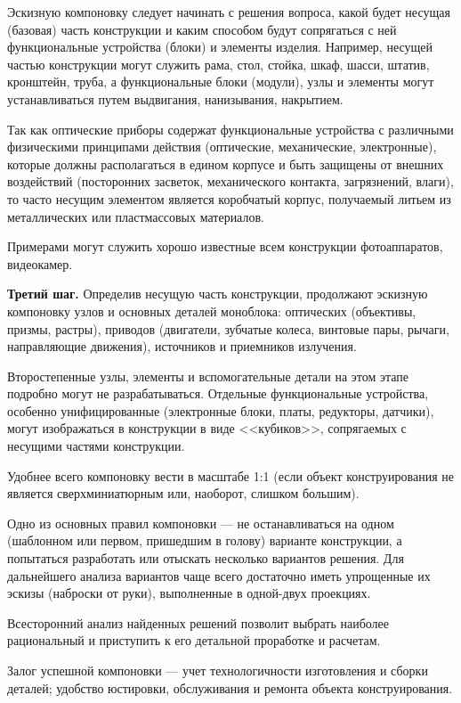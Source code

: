 Эскизную компоновку следует начинать с решения вопроса, какой будет несущая (базовая) часть конструкции и каким способом будут сопрягаться с ней функциональные устройства (блоки) и элементы изделия. Например, несущей частью конструкции могут служить рама, стол, стойка, шкаф, шасси, штатив, кронштейн, труба, а функциональные блоки (модули), узлы и элементы могут устанавливаться путем выдвигания, нанизывания, накрытием.

Так как оптические приборы содержат функциональные устройства с различными физическими принципами действия (оптические, механические, электронные), которые должны располагаться в едином корпусе и быть защищены от внешних воздействий (посторонних засветок, механического контакта, загрязнений, влаги), то часто несущим элементом является коробчатый корпус, получаемый литьем из металлических или пластмассовых материалов.

Примерами могут служить хорошо известные всем конструкции фотоаппаратов, видеокамер.

\textbf{Третий шаг.} Определив несущую часть конструкции, продолжают эскизную компоновку узлов и основных деталей моноблока: оптических (объективы, призмы, растры), приводов (двигатели, зубчатые колеса, винтовые пары, рычаги, направляющие движения), источников и приемников излучения.

Второстепенные узлы, элементы и вспомогательные детали на этом этапе подробно могут не разрабатываться. Отдельные функциональные устройства, особенно унифицированные (электронные блоки, платы, редукторы, датчики), могут изображаться в конструкции в виде <<кубиков>>, сопрягаемых с несущими частями конструкции.

Удобнее всего компоновку вести в масштабе 1:1 (если объект конструирования не является сверхминиатюрным или, наоборот, слишком большим).

Одно из основных правил компоновки --- не останавливаться на одном (шаблонном или первом, пришедшим в голову) варианте конструкции, а попытаться разработать или отыскать несколько вариантов решения. Для дальнейшего анализа вариантов чаще всего достаточно иметь упрощенные их эскизы (наброски от руки), выполненные в одной-двух проекциях.

Всесторонний анализ найденных решений позволит выбрать наиболее рациональный и приступить к его детальной проработке и расчетам.

Залог успешной компоновки --- учет технологичности изготовления и сборки деталей; удобство юстировки, обслуживания и ремонта объекта конструирования.

